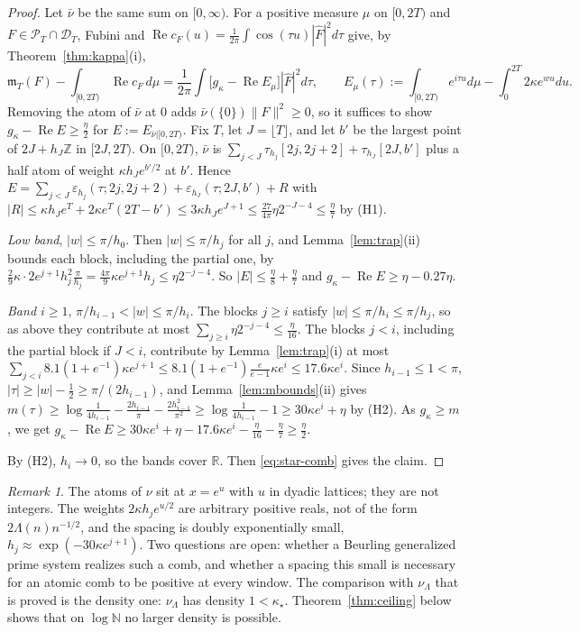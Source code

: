 \documentclass[11pt]{amsart}
\theoremstyle{definition}
\theoremstyle{remark}
\newtheorem{remark}[theorem]{Remark}
\newcommand{\R}{\mathbb R}
\newcommand{\N}{\mathbb N}
\newcommand{\Z}{\mathbb Z}
\newcommand{\Rel}{\operatorname{Re}}
\newcommand{\PT}{\mathcal P_T}
\newcommand{\Fh}{\widehat F}
\newcommand{\cF}{c_F}
\newcommand{\mT}{\mathfrak m_T}
\begin{document}
\begin{proof}
Let $\bar\nu$ be the same sum on $[0,\infty)$. For a positive measure $\mu$ on $[0,2T)$ and $F\in\PT\cap\mathcal D_T$, Fubini and
$\Rel\cF(u)=\frac1{2\pi}\int\cos(\tau u)|\Fh|^2d\tau$ give, by Theorem~\ref{thm:kappa}(i),
\begin{equation}\label{eq:star-comb}
\mT(F)-\int_{[0,2T)}\Rel\cF\,d\mu=\frac1{2\pi}\int\big[g_\kappa-\Rel E_\mu\big]|\Fh|^2d\tau,\qquad
E_\mu(\tau):=\int_{[0,2T)}e^{i\tau u}d\mu-\int_0^{2T}2\kappa e^{wu}du .
\end{equation}
Removing the atom of $\bar\nu$ at $0$ adds $\bar\nu(\{0\})\|F\|^2\ge0$, so it suffices to show $g_\kappa-\Rel E\ge\frac\eta2$ for
$E:=E_{\bar\nu|[0,2T)}$. Fix $T$, let $J=\lfloor T\rfloor$, and let $b'$ be the largest point of $2J+h_J\Z$ in $[2J,2T)$. On $[0,2T)$,
$\bar\nu$ is $\sum_{j<J}\tau_{h_j}[2j,2j+2]+\tau_{h_J}[2J,b']$ plus a half atom of weight $\kappa h_Je^{b'/2}$ at $b'$. Hence
$E=\sum_{j<J}\varepsilon_{h_j}(\tau;2j,2j+2)+\varepsilon_{h_J}(\tau;2J,b')+R$ with
$|R|\le\kappa h_Je^{T}+2\kappa e^T(2T-b')\le3\kappa h_Je^{J+1}\le\frac{27}{4\pi}\eta2^{-J-4}\le\frac\eta7$ by (H1).

\emph{Low band}, $|w|\le\pi/h_0$. Then $|w|\le\pi/h_j$ for all $j$, and Lemma~\ref{lem:trap}(ii) bounds each block, including the
partial one, by $\frac29\kappa\cdot2e^{j+1}h_j^2\frac\pi{h_j}=\frac{4\pi}9\kappa e^{j+1}h_j\le\eta2^{-j-4}$. So $|E|\le\frac\eta8+\frac\eta7$
and $g_\kappa-\Rel E\ge\eta-0.27\eta$.

\emph{Band $i\ge1$}, $\pi/h_{i-1}<|w|\le\pi/h_i$. The blocks $j\ge i$ satisfy $|w|\le\pi/h_i\le\pi/h_j$, so as above they contribute at
most $\sum_{j\ge i}\eta2^{-j-4}\le\frac\eta{16}$. The blocks $j<i$, including the partial block if $J<i$, contribute by
Lemma~\ref{lem:trap}(i) at most $\sum_{j<i}8.1(1+e^{-1})\kappa e^{j+1}\le8.1(1+e^{-1})\frac e{e-1}\kappa e^i\le17.6\kappa e^i$.
Since $h_{i-1}\le1<\pi$, $|\tau|\ge|w|-\frac12\ge\pi/(2h_{i-1})$, and Lemma~\ref{lem:mbounds}(ii) gives
$m(\tau)\ge\log\frac1{4h_{i-1}}-\frac{2h_{i-1}}\pi-\frac{2h_{i-1}^2}{\pi^2}\ge\log\frac1{4h_{i-1}}-1\ge30\kappa e^i+\eta$ by (H2). As
$g_\kappa\ge m$, we get $g_\kappa-\Rel E\ge30\kappa e^i+\eta-17.6\kappa e^i-\frac\eta{16}-\frac\eta7\ge\frac\eta2$.

By (H2), $h_i\to0$, so the bands cover $\R$. Then \eqref{eq:star-comb} gives the claim.
\end{proof}

\begin{remark}\label{rem:atomic}
The atoms of $\nu$ sit at $x=e^u$ with $u$ in dyadic lattices; they are not integers. The weights $2\kappa h_je^{u/2}$ are arbitrary
positive reals, not of the form $2\Lambda(n)n^{-1/2}$, and the spacing is doubly exponentially small,
$h_j\approx\exp(-30\kappa e^{j+1})$. Two questions are open: whether a Beurling generalized prime system realizes such a comb,
and whether a spacing this small is necessary for an atomic comb to be positive at every window. The comparison with
$\nu_\Lambda$ that is proved is the density one: $\nu_\Lambda$ has density $1<\kappa_\star$. Theorem~\ref{thm:ceiling} below shows that
on $\log\N$ no larger density is possible.
\end{remark}
\end{document}
